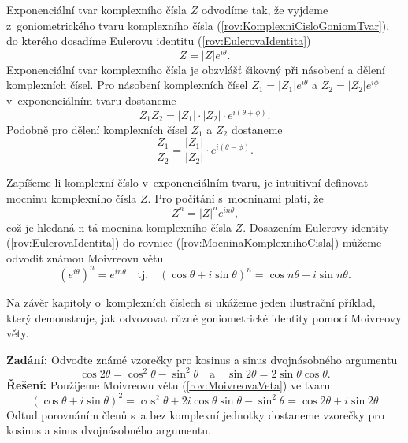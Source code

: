 Exponenciální tvar komplexního čísla $Z$ odvodíme tak, že vyjdeme z~goniometrického tvaru komplexního čísla (\ref{rov:KomplexniCisloGoniomTvar}), do kterého dosadíme Eulerovu identitu (\ref{rov:EulerovaIdentita})
\begin{equation}
Z = |Z| e^{i \theta} \mbox{.}
\label{rov:ExponencialniTvar}
\end{equation}
Exponenciální tvar komplexního čísla je obzvlášť šikovný při násobení a dělení komplexních čísel. Pro násobení komplexních čísel $Z_1 = |Z_1| e^{i \theta}$ a $Z_2 = |Z_2|e^{i \phi}$ v~exponenciálním tvaru dostaneme
\begin{equation}
Z_1Z_2 = |Z_1| \cdot |Z_2| \cdot e^{i(\theta + \phi)} \mbox{.}
\label{rov:NasobeniExponencialniTvar} 
\end{equation}
Podobně pro dělení komplexních čísel $Z_1$ a $Z_2$ dostaneme
\begin{equation}
\frac{Z_1}{Z_2} = \frac{|Z_1|}{|Z_2|} \cdot e^{i(\theta - \phi)} \mbox{.}
\label{rov:DeleniExponencialniTvar}
\end{equation}

Zapíšeme-li komplexní číslo v~exponenciálním tvaru, je intuitivní definovat mocninu komplexního čísla $Z$. Pro počítání s~mocninami platí, že 
\begin{equation}
Z^n = |Z|^n e^{in\theta} \mbox{,}
\label{rov:MocninaKomplexnihoCisla}
\end{equation}
což je hledaná n-tá mocnina komplexního čísla $Z$. Dosazením Eulerovy identity (\ref{rov:EulerovaIdentita}) do rovnice (\ref{rov:MocninaKomplexnihoCisla}) můžeme odvodit známou Moivreovu větu
\begin{equation}
(e^{i\theta})^n = e^{i n \theta} \quad \mbox{tj.} \quad (\cos \theta + i \sin \theta )^n = \cos n\theta + i \sin n\theta \mbox{.}
\label{rov:MoivreovaVeta}
\end{equation}

Na závěr kapitoly o~komplexních číslech si ukážeme jeden ilustrační příklad, který demonstruje, jak odvozovat různé goniometrické identity pomocí Moivreovy věty.

\begin{priklad}
\textbf{Zadání:} Odvoďte známé vzorečky pro kosinus a sinus dvojnásobného argumentu
\begin{displaymath}
\cos 2\theta = \cos^2 \theta - \sin^2 \theta \quad \mbox{a} \quad
\sin 2\theta = 2 \sin \theta \cos \theta \mbox{.}
\end{displaymath}
\textbf{Řešení:} Použijeme Moivreovu větu (\ref{rov:MoivreovaVeta}) ve tvaru
\begin{displaymath}
(\cos \theta + i \sin \theta )^2 = \cos^2 \theta + 2 i \cos \theta \sin \theta - \sin^2 \theta = \cos 2 \theta + i \sin 2 \theta
\end{displaymath}
Odtud porovnáním členů s~a bez komplexní jednotky dostaneme vzorečky pro kosinus a sinus dvojnásobného argumentu.
\end{priklad}

